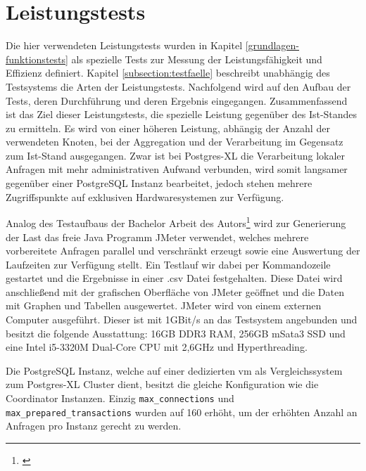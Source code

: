 \section{Leistungstests}
\label{section:leistungstests}
Die hier verwendeten Leistungstests wurden in Kapitel \ref{grundlagen-funktionstests} als spezielle Tests zur Messung der Leistungsfähigkeit und Effizienz definiert.
Kapitel \ref{subsection:testfaelle} beschreibt unabhängig des Testsystems die Arten der Leistungstests.
Nachfolgend wird auf den Aufbau der Tests, deren Durchführung und deren Ergebnis eingegangen.
Zusammenfassend ist das Ziel dieser Leistungstests, die spezielle Leistung gegenüber des Ist-Standes zu ermitteln.
Es wird von einer höheren Leistung, abhängig der Anzahl der verwendeten Knoten, bei der Aggregation und der Verarbeitung im Gegensatz zum Ist-Stand ausgegangen.
Zwar ist bei Postgres-XL die Verarbeitung lokaler Anfragen mit mehr administrativen Aufwand verbunden,  wird somit langsamer gegenüber einer PostgreSQL Instanz bearbeitet, jedoch stehen mehrere Zugriffspunkte auf exklusiven Hardwaresystemen zur Verfügung.

Analog des Testaufbaus der Bachelor Arbeit des Autors\footnote{\cite{ba:kurt}} wird zur Generierung der Last das freie Java Programm JMeter verwendet, welches mehrere vorbereitete Anfragen parallel und verschränkt erzeugt sowie eine Auswertung der Laufzeiten zur Verfügung stellt.
Ein Testlauf wir dabei per Kommandozeile gestartet und die Ergebnisse in einer .csv Datei festgehalten.
Diese Datei wird anschließend mit der grafischen Oberfläche von JMeter geöffnet und die Daten mit Graphen und Tabellen ausgewertet.
JMeter wird von einem externen Computer ausgeführt.
Dieser ist mit 1GBit/s an das Testsystem angebunden und besitzt die folgende Ausstattung:
16GB DDR3 RAM, 256GB mSata3 SSD und eine Intel i5-3320M Dual-Core CPU mit 2,6GHz und Hyperthreading.

Die PostgreSQL Instanz, welche auf einer dedizierten \Gls{vm} als Vergleichssystem zum Postgres-XL Cluster dient, besitzt die gleiche Konfiguration wie die Coordinator Instanzen.
Einzig \verb+max_connections+ und \verb+max_prepared_transactions+ wurden auf 160 erhöht, um der erhöhten Anzahl an Anfragen pro Instanz  gerecht zu werden.

